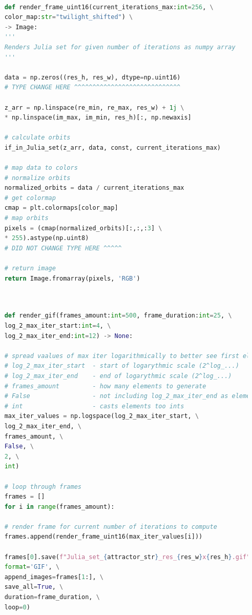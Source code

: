 \documentclass{article}
\begin{document}
\begin{lstlisting}[language=Python, caption=Frame rendering function utilizing uint16 data type]
	
	def render_frame_uint16(current_iterations_max:int=256, \
	color_map:str="twilight_shifted") \
	-> Image:
	'''
	Renders Julia set for given number of iterations as numpy array
	'''
	
	data = np.zeros((res_h, res_w), dtype=np.uint16)
	# TYPE CHANGE HERE ^^^^^^^^^^^^^^^^^^^^^^^^^^^^^
	
	z_arr = np.linspace(re_min, re_max, res_w) + 1j \
	* np.linspace(im_max, im_min, res_h)[:, np.newaxis]
	
	# calculate orbits
	if_in_Julia_set(z_arr, data, const, current_iterations_max)
	
	# map data to colors
	# normalize orbits 
	normalized_orbits = data / current_iterations_max
	# get colormap
	cmap = plt.colormaps[color_map]
	# map orbits
	pixels = (cmap(normalized_orbits)[:,:,:3] \
	* 255).astype(np.uint8)
	# DID NOT CHANGE TYPE HERE ^^^^^
	
	# return image
	return Image.fromarray(pixels, 'RGB')
	
\end{lstlisting}

\pagebreak
{}

\begin{lstlisting}[language=Python, caption=Zoom effect rendering function]
	
	def render_gif(frames_amount:int=500, frame_duration:int=25, \
	log_2_max_iter_start:int=4, \
	log_2_max_iter_end:int=12) -> None:
	
	# spread vaalues of max iter logarithmically to better see first elements
	# log_2_max_iter_start  - start of logarythmic scale (2^log_...)
	# log_2_max_iter_end    - end of logarythmic scale (2^log_...)
	# frames_amount         - how many elements to generate
	# False                 - not including log_2_max_iter_end as element (ensures not getting to limit of uint16 data type)
	# int                   - casts elements too ints
	max_iter_values = np.logspace(log_2_max_iter_start, \
	log_2_max_iter_end, \
	frames_amount, \
	False, \
	2, \
	int)
	
	# loop through frames
	frames = []
	for i in range(frames_amount):
	
	# render frame for current number of iterations to compute
	frames.append(render_frame_uint16(max_iter_values[i]))
	
	frames[0].save(f"Julia_set_{attractor_str}_res_{res_w}x{res_h}.gif", \
	format='GIF', \
	append_images=frames[1:], \
	save_all=True, \
	duration=frame_duration, \
	loop=0)
	
\end{lstlisting}
\end{document}
